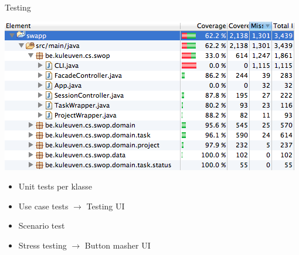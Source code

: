 \documentclass[mathserif,serif]{beamer}
\begin{document}
  \begin{frame}{Testing}
      \begin{center}
      \includegraphics[width=\textwidth,height=0.6\textheight,keepaspectratio]{code_coverage.png}
        \begin{itemize}
        \item Unit tests per klasse
        \item Use case tests $\rightarrow$ Testing UI
        \item Scenario test
        \item Stress testing $\rightarrow$ Button masher UI
        \end{itemize}
      \end{center}
  \end{frame}

\end{document}
